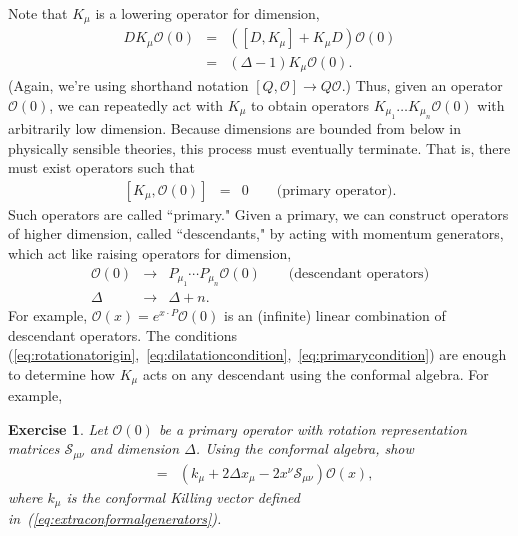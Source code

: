 \documentclass{ws-rv9x6}
\newcommand\be{\begin{eqnarray}}
\newcommand\ee{\end{eqnarray}}
\newcommand\cO{\mathcal{O}}
\newcommand\<\langle
\renewcommand\>\rangle
\newcommand\nn{\nonumber}
\renewcommand\.{\cdot}
\newcommand\De{\Delta}
\newcommand\cS{\mathcal{S}}
\newtheorem{exercise}{Exercise}[section]
\begin{document}
Note that $K_\mu$ is a lowering operator for dimension,
\be
D K_\mu \cO(0) &=& ([D,K_\mu] + K_\mu D)\cO(0)\nn\\
&=& (\De-1)K_\mu \cO(0).
\ee
(Again, we're using shorthand notation $[Q,\cO]\to Q\cO$.)  Thus, given an operator $\cO(0)$, we can repeatedly act with $K_\mu$ to obtain operators $K_{\mu_1}\dots K_{\mu_n}\cO(0)$ with arbitrarily low dimension.  Because dimensions are bounded from below in physically sensible theories, this process must eventually terminate.  That is, there must exist operators such that
\be
\label{eq:primarycondition}
[K_\mu,\cO(0)] &=& 0\qquad\textrm{(primary operator)}.
\ee
Such operators are called ``primary."  Given a primary, we can construct operators of higher dimension, called ``descendants," by acting with momentum generators, which act like raising operators for dimension,
\be
\cO(0) &\to& P_{\mu_1}\cdots P_{\mu_n}\cO(0)\qquad\textrm{(descendant operators)}\nn\\
\De &\to& \De+n.
\ee
For example, $\cO(x)=e^{x\.P}\cO(0)$ is an (infinite) linear combination of descendant operators.
The conditions (\ref{eq:rotationatorigin},~\ref{eq:dilatationcondition},~\ref{eq:primarycondition}) are enough to determine how $K_\mu$ acts on any descendant using the conformal algebra.  For example,
\begin{exercise}
Let $\cO(0)$ be a primary operator with rotation representation matrices $\cS_{\mu\nu}$ and dimension $\Delta$.  Using the conformal algebra, show
\be
[K_\mu, \cO(x)] &=& (k_\mu + 2\De x_\mu - 2x^\nu \cS_{\mu\nu})\cO(x),
\label{eq:actionofK}
\ee
where $k_\mu$ is the conformal Killing vector defined in~(\ref{eq:extraconformalgenerators}). 
\end{exercise}
\end{document}
